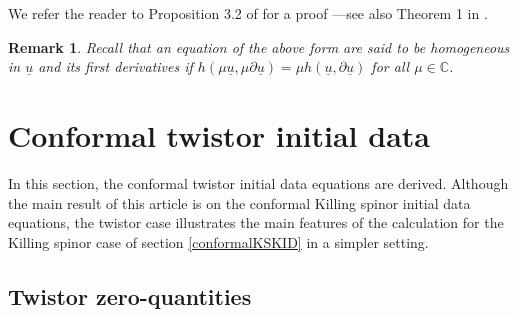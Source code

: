 \documentclass[10pt,a4paper]{article}
\theoremstyle{plain}
\newtheorem{remark}{Remark}
\begin{document}
We refer the reader to Proposition 3.2 of \cite{Tay96c} for a proof
---see also Theorem 1 in \cite{GarVal08c}.

\begin{remark}
\emph{ Recall that an equation of the
above form are said to be \textit{homogeneous in} $\underline{u}$
\textit{and its first derivatives} if
$h (\mu\underline{u},\mu\partial\underline{u})=\mu
h(\underline{u}, \partial\underline{u})$ for all
$\mu\in\mathbb{C}$. }
\end{remark}


  \section{Conformal twistor initial data}
  \label{conformalTwistorKID}
  In this section, the conformal twistor initial data equations are
  derived.  Although the main result of this article is on the
  conformal  Killing spinor initial data equations, the twistor case
    illustrates the main features of the calculation for the Killing
  spinor case of section \ref{conformalKSKID} in a simpler setting.
\subsection{Twistor zero-quantities}
\label{Sec:TwistorZeroQuantities}
\end{document}
